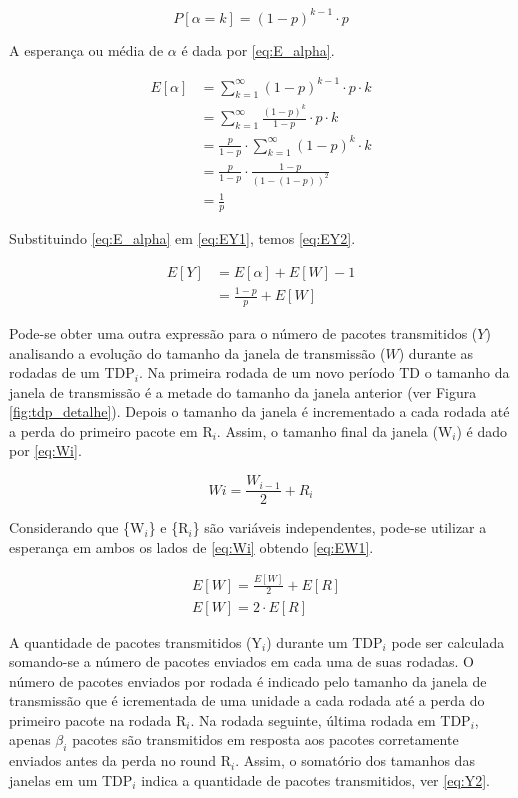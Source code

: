 \begin{equation} \label{eq:P_alpha}
P[\alpha=k]=(1 - p)^{k - 1} \cdot p
\end{equation}

A esperança ou média de $\alpha$ é dada por \eqref{eq:E_alpha}.

\begin{align} \label{eq:E_alpha}
\nonumber E[\alpha] &= \sum_{k=1}^\infty (1 - p)^{k - 1} \cdot  p \cdot  k \\
\nonumber &= \sum_{k=1}^\infty \frac{(1 - p)^{k}}{1 - p} \cdot  p \cdot  k\\ 
\nonumber &= \frac{p}{1 - p} \cdot  \sum_{k=1}^\infty (1 - p)^k \cdot  k \\ 
\nonumber &= \frac{p}{1 - p} \cdot  \frac{1 - p}{(1 - (1 - p))^2} \\
&= \frac{1}{p}
\end{align}

Substituindo \eqref{eq:E_alpha} em \eqref{eq:EY1}, temos \eqref{eq:EY2}. 

\begin{align} \label{eq:EY2}
\nonumber E[Y] &= E[\alpha] + E[W] - 1 \\
&= \frac{1 - p}{p} + E[W]
\end{align}

Pode-se obter uma outra expressão para o número de pacotes transmitidos ($Y$) analisando
a evolução do tamanho da janela de transmissão ($W$) durante as rodadas de um TDP$_i$.
Na primeira rodada de um novo período TD o tamanho da janela de transmissão é a metade
do tamanho da janela anterior (ver Figura \ref{fig:tdp_detalhe}). Depois o tamanho da janela
é incrementado a cada rodada até a perda do primeiro pacote em R{$_i$}. Assim, o tamanho 
final da janela (W$_i$) é dado por \eqref{eq:Wi}.

\begin{equation} \label{eq:Wi}
Wi=\frac{W_{i-1}}{2} + R_i
\end{equation}

Considerando que \{W$_i$\} e \{R$_i$\} são variáveis independentes, pode-se utilizar a 
esperança em ambos os lados de \eqref{eq:Wi} obtendo \eqref{eq:EW1}.

\begin{align} \label{eq:EW1}
\nonumber & E[W]=\frac{E[W]}{2} + E[R] \\
& E[W]= 2 \cdot  E[R]
\end{align}

A quantidade de pacotes transmitidos (Y$_i$) durante um TDP$_i$ pode ser calculada somando-se 
a número de pacotes enviados em cada uma de suas rodadas. O número de pacotes enviados por 
rodada é indicado pelo tamanho da janela de transmissão que é icrementada de uma unidade a 
cada rodada até a perda do primeiro pacote na rodada R$_i$. Na rodada seguinte, última rodada 
em TDP$_i$, apenas $\beta_i$ pacotes são transmitidos em resposta aos pacotes corretamente 
enviados antes da perda no round R$_i$. Assim, o somatório dos tamanhos das janelas em um 
TDP$_i$ indica a quantidade de pacotes transmitidos, ver \eqref{eq:Y2}.


